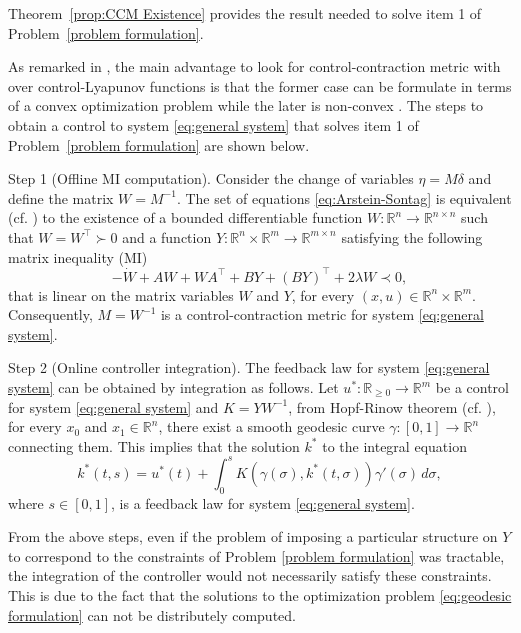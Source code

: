 \documentclass[10pt,twocolumn,twoside]{IEEEtran}
\theoremstyle{plain}
\theoremstyle{definition}
\theoremstyle{remark}
\begin{document}
Theorem~\ref{prop:CCM Existence} provides the result needed to solve item 1 of Problem~\ref{problem formulation}.

As remarked in \cite{Manchester2014a}, the main advantage to look for control-contraction metric with over control-Lyapunov functions is that the former case can be formulate in terms of a convex optimization problem while the later is non-convex \cite{Rantzer:2001}. The steps to obtain a control to system \eqref{eq:general system} that solves item 1 of Problem~\ref{problem formulation} are shown below.

Step 1 (Offline MI computation). Consider the change of variables $\eta=M\delta$ and define the matrix $W=M^{-1}$. The set of equations \eqref{eq:Arstein-Sontag} is equivalent (cf. \cite[Lemma 11.1]{CalafioreGhaoui2014}) to the existence of a bounded differentiable function $W:\mathbb{R}^n\to\mathbb{R}^{n\times n}$ such that $W=W^\top\succ0$ and a function $Y:\mathbb{R}^n\times\mathbb{R}^m\to\mathbb{R}^{m\times n}$ satisfying the following matrix inequality (MI)
\begin{equation}\label{eq:MI formulation}
	-\dot{W}+AW+WA^\top+BY+(BY)^\top+2\lambda W\prec0,
\end{equation}
that is linear on the matrix variables $W$ and $Y$, for every $(x,u)\in\mathbb{R}^n\times\mathbb{R}^m$. Consequently, $M=W^{-1}$ is a control-contraction metric for system \eqref{eq:general system}.

Step 2 (Online controller integration). The feedback law for system \eqref{eq:general system} can be obtained by integration as follows. Let $u^\ast:\mathbb{R}_{\geq0}\to\mathbb{R}^m$ be a control for system \eqref{eq:general system} and $K=YW^{-1}$, from Hopf-Rinow theorem (cf. \cite[Theorem 7.7]{Boothby1986}), for every $x_0$ and $x_1\in\mathbb{R}^n$, there exist a smooth geodesic curve $\gamma:[0,1]\to\mathbb{R}^n$ connecting them. This implies that the solution $k^\ast$ to the integral equation
\begin{equation}\label{eq:contracting feedback law}
	k^\ast(t,s)=u^\ast(t)+\int_0^s K(\gamma(\sigma),k^\ast(t,\sigma))\gamma'(\sigma)\,d\sigma,
\end{equation}
where $s\in[0,1]$, is a feedback law for system \eqref{eq:general system}.

From the above steps, even if the problem of imposing a particular structure on $Y$ to correspond to the constraints of Problem \ref{problem formulation} was tractable, the integration of the controller would not necessarily satisfy these constraints. This is due to the fact that the solutions to the optimization problem \eqref{eq:geodesic formulation} can not be distributely computed.
\end{document}
